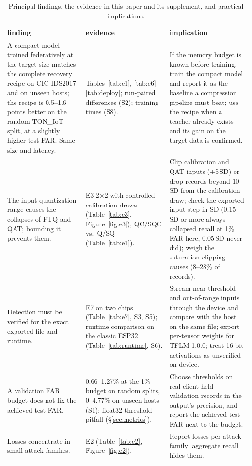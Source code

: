 \documentclass[sigplan,10pt,review,anonymous,nonacm]{acmart}
\newcommand{\cic}{CIC-IDS2017\xspace}
\newcommand{\ton}{TON\_IoT\xspace}
\begin{document}
\begin{table}[t]
\caption{Principal findings, the evidence in this paper and its supplement, and practical implications.}
\label{tab:findings}
\small\setlength{\tabcolsep}{3pt}
\begin{tabular}{L{0.29\textwidth}L{0.29\textwidth}L{0.37\textwidth}}
\toprule
finding & evidence & implication \\
\midrule
A compact model trained federatively at the target size matches the complete recovery recipe on \cic
and on unseen hosts; the recipe is 0.5--1.6 points better on the random \ton split, at a slightly
higher test FAR. Same size and latency. &
Tables~\ref{tab:e1}, \ref{tab:e6}, \ref{tab:deploy}; run-paired differences (S2); training times (S8). &
If the memory budget is known before training, train the compact model and report it as the baseline a
compression pipeline must beat; use the recipe when a teacher already exists and its gain on the target
data is confirmed. \\
The input quantization range causes the collapses of PTQ and QAT; bounding it prevents them. &
E3 2$\times$2 with controlled calibration draws (Table~\ref{tab:e3}, Figure~\ref{fig:e3}); QC/SQC vs.\ Q/SQ
(Table~\ref{tab:e1}). &
Clip calibration and QAT inputs ($\pm$5\,SD) or drop records beyond 10\,SD from the calibration draw; check
the exported input step in SD (0.15\,SD or more always collapsed recall at 1\% FAR here, 0.05\,SD never
did); weigh the saturation clipping causes (8--28\% of records). \\
Detection must be verified for the exact exported file and runtime. &
E7 on two chips (Table~\ref{tab:e7}, S3, S5); runtime comparison on the classic ESP32
(Table~\ref{tab:runtime}, S6). &
Stream near-threshold and out-of-range inputs through the device and compare with the host on the same
file; export per-tensor weights for TFLM 1.0.0; treat 16-bit activations as unverified on device. \\
A validation FAR budget does not fix the achieved test FAR. &
0.66--1.27\% at the 1\% budget on random splits, 0--4.77\% on unseen hosts (S1); float32 threshold
pitfall (\S\ref{sec:metrics}). &
Choose thresholds on real client-held validation records in the output's precision, and report the
achieved test FAR next to the budget. \\
Losses concentrate in small attack families. &
E2 (Table~\ref{tab:e2}, Figure~\ref{fig:e2}). &
Report losses per attack family; aggregate recall hides them. \\
\bottomrule
\end{tabular}
\end{table}
\end{document}
